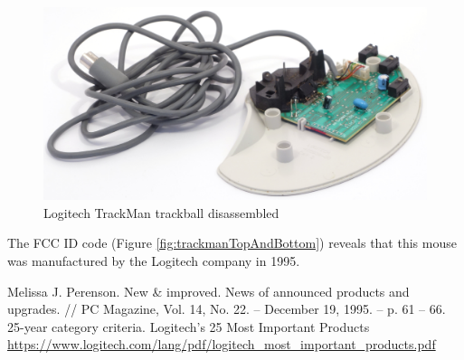 \documentclass[11pt, a4paper]{article}
\begin{document}
\begin{figure}[h]
    \centering
    \includegraphics[scale=0.6]{1995_logitech_trackman/inside_30.jpg}
    \caption{Logitech TrackMan trackball disassembled}
    \label{fig:trackmanInside}
\end{figure}

 The FCC ID code (Figure \ref{fig:trackmanTopAndBottom}) reveals that this mouse was manufactured by the Logitech company in 1995.


\begin{thebibliography}{9}
 Melissa J. Perenson. New \& improved. News of announced products and upgrades. // PC Magazine, Vol. 14, No. 22. -- December 19, 1995. -- p. 61 -- 66.
 25-year category criteria. Logitech’s 25 Most Important Products \url{https://www.logitech.com/lang/pdf/logitech_most_important_products.pdf}
\end{thebibliography}
\end{document}
